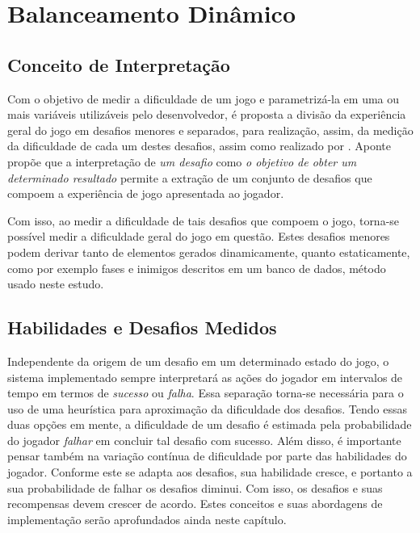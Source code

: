 
\chapter{Balanceamento Dinâmico}
\label{cap:balanceamento dinamico}
\section{Conceito de Interpretação}

Com o objetivo de medir a dificuldade de um jogo e parametrizá-la em uma ou mais variáveis utilizáveis pelo desenvolvedor, é proposta a divisão da experiência geral do jogo em desafios menores e separados, para realização, assim, da medição da dificuldade de cada um destes desafios, assim como realizado por \citet{ExperimentalValidation}. Aponte propõe que a interpretação de \emph{um desafio} como \emph{o objetivo de obter um determinado resultado} permite a extração de um conjunto de desafios que compoem a experiência de jogo apresentada ao jogador.

Com isso, ao medir a dificuldade de tais desafios que compoem o jogo, torna-se possível medir a dificuldade geral do jogo em questão. Estes desafios menores podem derivar tanto de elementos gerados dinamicamente, quanto estaticamente, como por exemplo fases e inimigos descritos em um banco de dados, método usado neste estudo.

\section{Habilidades e Desafios Medidos}

Independente da origem de um desafio em um determinado estado do jogo, o sistema implementado sempre interpretará as ações do jogador em intervalos de tempo em termos de \textit{sucesso} ou \textit{falha}. Essa separação torna-se necessária para o uso de uma heurística para aproximação da dificuldade dos desafios. Tendo essas duas opções em mente, a dificuldade de um desafio é estimada pela probabilidade do jogador \textit{falhar} em concluir tal desafio com sucesso. Além disso, é importante pensar também na variação contínua de dificuldade por parte das habilidades do jogador. Conforme este se adapta aos desafios, sua habilidade cresce, e portanto a sua probabilidade de falhar os desafios diminui. Com isso, os desafios e suas recompensas devem crescer de acordo. Estes conceitos e suas abordagens de implementação serão aprofundados ainda neste capítulo.

